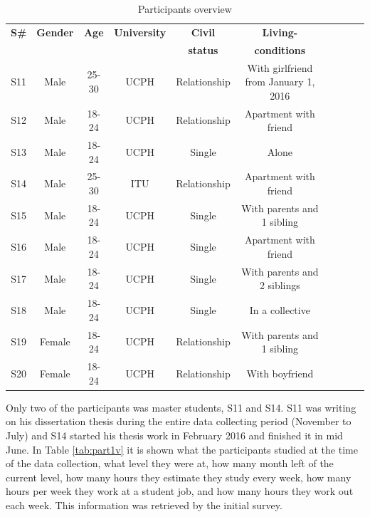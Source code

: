 \documentclass[12pt]{article} %
\begin{document}
\begin{table}[H]
\center
\begin{footnotesize}
	\begin{tabular}{| c | c | c | c | c | c | c | c | c | c |}
	\hline
	\textbf{S\#} & \textbf{Gender} & \textbf{Age} & \textbf{University} & \textbf{Civil} & \textbf{Living-}\\
	 & \textbf{} & \textbf{} & \textbf{} & \textbf{status} & \textbf{conditions} \\
	
	\hline
	S11 & Male & 25-30 & UCPH & Relationship & With girlfriend from January 1, 2016 \\
	\hline
	S12 & Male & 18-24 & UCPH & Relationship & Apartment with friend\\
	\hline
	S13 & Male & 18-24 & UCPH & Single & Alone \\
	\hline
	S14 & Male & 25-30 & ITU & Relationship & Apartment with friend \\
	\hline
	S15 & Male & 18-24 & UCPH & Single & With parents  and 1 sibling\\
	\hline
	S16 & Male & 18-24 & UCPH & Single & Apartment with friend\\
	\hline
	S17 & Male & 18-24 & UCPH & Single & With parents and 2 siblings \\
	\hline
	S18 & Male & 18-24 & UCPH & Single & In a collective\\
	\hline
	S19 & Female & 18-24 & UCPH & Relationship & With parents and 1 sibling\\
	\hline
	S20 & Female & 18-24 & UCPH & Relationship & With boyfriend\\
	\hline
	\end{tabular}
	\caption{Participants overview}
	\label{tab:partOv}
\end{footnotesize}
\end{table}

Only two of the participants was master students, S11 and S14. S11 was writing on his dissertation thesis during the entire data collecting period (November to July) and S14 started his thesis work in February 2016 and finished it in mid June. In Table \ref{tab:part1v} it is shown what the participants studied at the time of the data collection, what level they were at, how many month left of the current level, how many hours they estimate they study every week, how many hours per week they work at a student job, and how many hours they work out each week. This information was retrieved by the initial survey.   
\end{document}
